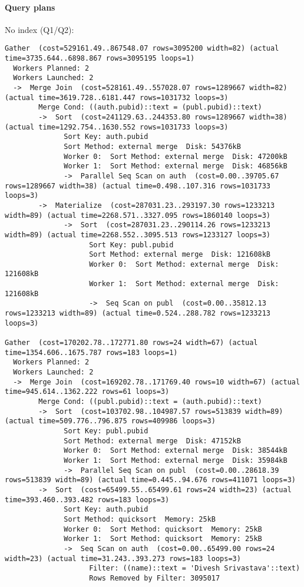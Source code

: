 \documentclass[11pt]{scrartcl}
\begin{document}
\paragraph{Query plans}\mbox{}

No index (Q1/Q2):

{\small
\parskip0pt\begin{verbatim}
Gather  (cost=529161.49..867548.07 rows=3095200 width=82) (actual time=3735.644..6898.867 rows=3095195 loops=1)
  Workers Planned: 2
  Workers Launched: 2
  ->  Merge Join  (cost=528161.49..557028.07 rows=1289667 width=82) (actual time=3619.728..6181.447 rows=1031732 loops=3)
        Merge Cond: ((auth.pubid)::text = (publ.pubid)::text)
        ->  Sort  (cost=241129.63..244353.80 rows=1289667 width=38) (actual time=1292.754..1630.552 rows=1031733 loops=3)
              Sort Key: auth.pubid
              Sort Method: external merge  Disk: 54376kB
              Worker 0:  Sort Method: external merge  Disk: 47200kB
              Worker 1:  Sort Method: external merge  Disk: 46856kB
              ->  Parallel Seq Scan on auth  (cost=0.00..39705.67 rows=1289667 width=38) (actual time=0.498..107.316 rows=1031733 loops=3)
        ->  Materialize  (cost=287031.23..293197.30 rows=1233213 width=89) (actual time=2268.571..3327.095 rows=1860140 loops=3)
              ->  Sort  (cost=287031.23..290114.26 rows=1233213 width=89) (actual time=2268.552..3095.513 rows=1233127 loops=3)
                    Sort Key: publ.pubid
                    Sort Method: external merge  Disk: 121608kB
                    Worker 0:  Sort Method: external merge  Disk: 121608kB
                    Worker 1:  Sort Method: external merge  Disk: 121608kB
                    ->  Seq Scan on publ  (cost=0.00..35812.13 rows=1233213 width=89) (actual time=0.524..288.782 rows=1233213 loops=3)

Gather  (cost=170202.78..172771.80 rows=24 width=67) (actual time=1354.606..1675.787 rows=183 loops=1)
  Workers Planned: 2
  Workers Launched: 2
  ->  Merge Join  (cost=169202.78..171769.40 rows=10 width=67) (actual time=945.614..1362.222 rows=61 loops=3)
        Merge Cond: ((publ.pubid)::text = (auth.pubid)::text)
        ->  Sort  (cost=103702.98..104987.57 rows=513839 width=89) (actual time=509.776..796.875 rows=409986 loops=3)
              Sort Key: publ.pubid
              Sort Method: external merge  Disk: 47152kB
              Worker 0:  Sort Method: external merge  Disk: 38544kB
              Worker 1:  Sort Method: external merge  Disk: 35984kB
              ->  Parallel Seq Scan on publ  (cost=0.00..28618.39 rows=513839 width=89) (actual time=0.445..94.676 rows=411071 loops=3)
        ->  Sort  (cost=65499.55..65499.61 rows=24 width=23) (actual time=393.460..393.482 rows=183 loops=3)
              Sort Key: auth.pubid
              Sort Method: quicksort  Memory: 25kB
              Worker 0:  Sort Method: quicksort  Memory: 25kB
              Worker 1:  Sort Method: quicksort  Memory: 25kB
              ->  Seq Scan on auth  (cost=0.00..65499.00 rows=24 width=23) (actual time=31.243..393.273 rows=183 loops=3)
                    Filter: ((name)::text = 'Divesh Srivastava'::text)
                    Rows Removed by Filter: 3095017
\end{verbatim}}
\end{document}
